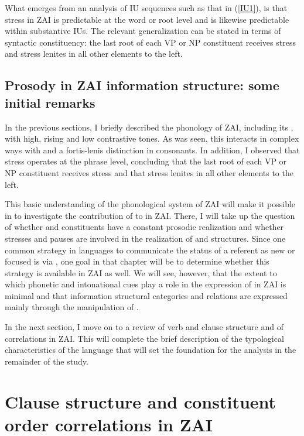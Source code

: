 What emerges from an analysis of IU sequences such as that in (\ref{IU1}), is that stress in ZAI is predictable at the word or root level and is likewise predictable within substantive IUs. The relevant generalization can be stated in terms of syntactic constituency: the last root of each VP or NP constituent receives stress and stress lenites in all other elements to the left. 


\subsection{Prosody in ZAI information structure: some initial remarks}\label{prosodyis}

In the previous sections, I briefly described the phonology of ZAI, including its , with high, rising and low contrastive tones. As was seen, this  interacts in complex ways with  and a fortis-lenis distinction in consonants. In addition, I observed that stress operates at the phrase level, concluding that the last root of each VP or NP constituent receives stress and that stress lenites in all other elements to the left. 

This basic understanding of the phonological system of ZAI will make it possible in  to investigate the contribution of  to  in ZAI. There, I will take up the question of whether  and  constituents have a constant prosodic realization and whether stresses and pauses are involved in the realization of  and  structures. Since one common strategy in languages to communicate the status of a referent as new or focused is via , one goal in that chapter will be to determine whether this strategy is available in ZAI as well. We will see, however, that the extent to which phonetic and intonational cues play a role in the expression of  in ZAI is minimal and that information structural categories and relations are expressed mainly through the manipulation of .

In the next section, I move on to a review of verb and clause structure and of  correlations in ZAI. This will complete the brief description of the typological characteristics of the language that will set the foundation for the analysis in the remainder of the study.


\section{Clause structure and constituent order correlations in ZAI}\label{wordorder}



